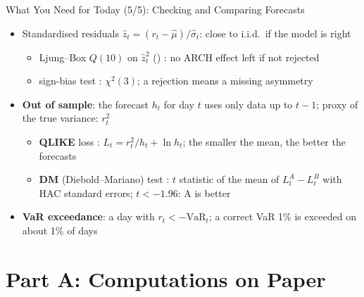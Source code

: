 \begin{frame}{What You Need for Today (5/5): Checking and Comparing Forecasts}
\itemsize{\small}
\begin{itemize}
    \item Standardised residuals $\hat z_t = (r_t - \hat\mu)/\hat\sigma_t$: close to i.i.d.\ if the model is right
    \begin{itemize}
        \item Ljung--Box $Q(10)$ on $\hat z_t^2$ () : no ARCH effect left if not rejected
        \item sign-bias test : $\chi^2(3)$; a rejection means a missing asymmetry
    \end{itemize}
    \item \textbf{Out of sample}: the forecast $h_t$ for day $t$ uses only data up to $t-1$; proxy of the true variance: $r_t^2$
    \begin{itemize}
        \item \textbf{QLIKE} loss : $L_t = r_t^2/h_t + \ln h_t$; the smaller the mean, the better the forecasts
        \item \textbf{DM} (Diebold--Mariano) test : $t$ statistic of the mean of $L_t^A - L_t^B$ with HAC standard errors; $t < -1.96$: A is better
    \end{itemize}
    \item \textbf{VaR exceedance}: a day with $r_t < -\mathrm{VaR}_t$; a correct VaR 1\% is exceeded on about 1\% of days
\end{itemize}
\end{frame}


\section{Part A: Computations on Paper}

